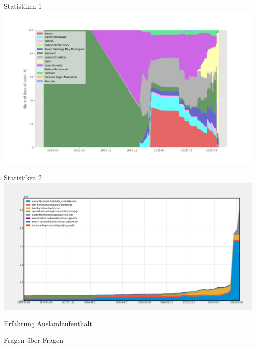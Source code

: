 \documentclass[presentation]{beamer}
\begin{document}
\begin{frame}[label={sec:org0b53452}]{Statistiken 1}
\includegraphics[width=1\textwidth]{stack.png}
\end{frame}

\begin{frame}{Statistiken 2}
\includegraphics[width=1\textwidth]{ownership.png}  
\end{frame}

\begin{frame}{Erfahrung Auslandaufenthalt}
\end{frame}

\begin{frame}{Fragen über Fragen}
\end{frame}
\end{document}
